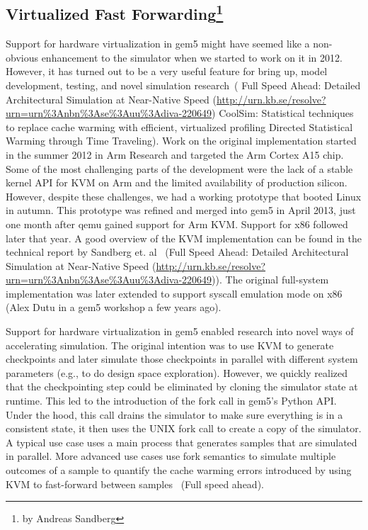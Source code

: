 \subsection[Virtualized Fast Forwarding]{Virtualized Fast Forwarding\footnote{by Andreas Sandberg}}

Support for hardware virtualization in gem5 might have seemed like a non-obvious enhancement to the simulator when we started to work on it in 2012.
However, it has turned out to be a very useful feature for bring up, model development, testing, and novel simulation research~\cite{}(
Full Speed Ahead: Detailed Architectural Simulation at Near-Native Speed (\url{http://urn.kb.se/resolve?urn=urn%3Anbn%3Ase%3Auu%3Adiva-220649})
CoolSim: Statistical techniques to replace cache warming with efficient, virtualized profiling
Directed Statistical Warming through Time Traveling).
Work on the original implementation started in the summer 2012 in Arm Research and targeted the Arm Cortex A15 chip. Some of the most challenging parts of the development were the lack of a stable kernel API for KVM on Arm and the limited availability of production silicon.
However, despite these challenges, we had a working prototype that booted Linux in autumn.
This prototype was refined and merged into gem5 in April 2013, just one month after qemu gained support for Arm KVM.
Support for x86 followed later that year.
A good overview of the KVM implementation can be found in the technical report by Sandberg et. al~\cite{} (Full Speed Ahead: Detailed Architectural Simulation at Near-Native Speed (\url{http://urn.kb.se/resolve?urn=urn%3Anbn%3Ase%3Auu%3Adiva-220649})).
The original full-system implementation was later extended to support syscall emulation mode on x86~\cite{} (Alex Dutu in a gem5 workshop a few years ago).

Support for hardware virtualization in gem5 enabled research into novel ways of accelerating simulation.
The original intention was to use KVM to generate checkpoints and later simulate those checkpoints in parallel with different system parameters (e.g., to do design space exploration).
However, we quickly realized that the checkpointing step could be eliminated by cloning the simulator state at runtime.
This led to the introduction of the fork call in gem5's Python API.
Under the hood, this call drains the simulator to make sure everything is in a consistent state, it then uses the UNIX fork call to create a copy of the simulator.
A typical use case uses a main process that generates samples that are simulated in parallel.
More advanced use cases use fork semantics to simulate multiple outcomes of a sample to quantify the cache warming errors introduced by using KVM to fast-forward between samples~\cite{} (Full speed ahead).
